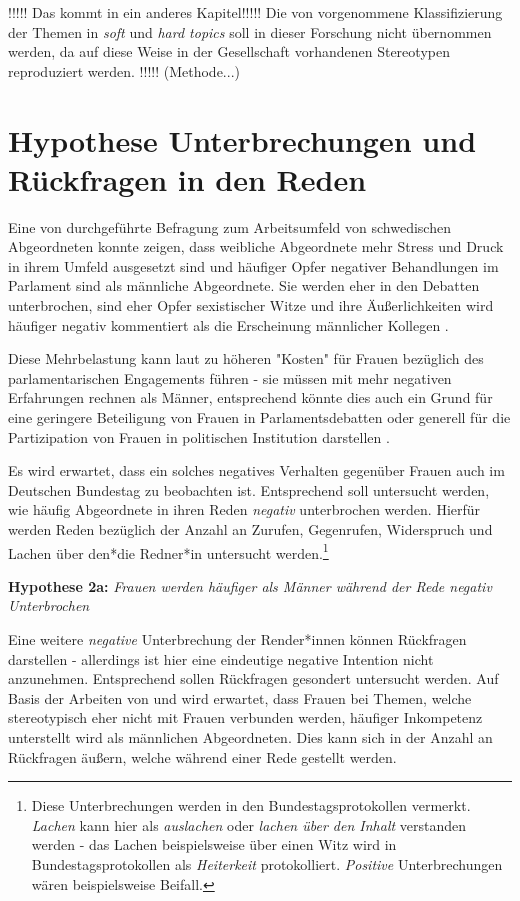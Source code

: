 \documentclass[12pt, 
    twoside=false, 
    bibliography=totoc, 
    numbers=endperiod, 
    headings=normal, 
    toc=chapterentrydotfill
    ]{scrbook}
\begin{document}
!!!!!  Das kommt in ein anderes Kapitel!!!!! Die von \textcite{back_2014} vorgenommene Klassifizierung der Themen in \emph{soft} und \emph{hard topics} soll in dieser Forschung nicht übernommen werden, da auf diese Weise in der Gesellschaft vorhandenen Stereotypen reproduziert werden. !!!!! (Methode...) 

\section{Hypothese Unterbrechungen und Rückfragen in den Reden}

Eine von \textcite{erikson_2018} durchgeführte Befragung zum Arbeitsumfeld von schwedischen Abgeordneten konnte zeigen, dass weibliche Abgeordnete mehr Stress und Druck in ihrem Umfeld ausgesetzt sind und häufiger Opfer negativer Behandlungen im Parlament sind als männliche Abgeordnete. Sie werden eher in den Debatten unterbrochen, sind eher Opfer sexistischer Witze und ihre Äußerlichkeiten wird häufiger negativ kommentiert als die Erscheinung männlicher Kollegen \parencite[13]{erikson_2018}.

Diese Mehrbelastung kann laut \textcite{erikson_2018} zu höheren "Kosten" für Frauen bezüglich des parlamentarischen Engagements führen - sie müssen mit mehr negativen Erfahrungen rechnen als Männer, entsprechend könnte dies auch ein Grund für eine geringere Beteiligung von Frauen in Parlamentsdebatten oder generell für die Partizipation von Frauen in politischen Institution darstellen \parencites[vgl.][]{erikson_2018}[vgl.][]{back_2014}.

Es wird erwartet, dass ein solches negatives Verhalten gegenüber Frauen auch im Deutschen Bundestag zu beobachten ist. Entsprechend soll untersucht werden, wie häufig Abgeordnete in ihren Reden \emph{negativ} unterbrochen werden. Hierfür werden Reden bezüglich der Anzahl an Zurufen, Gegenrufen, Widerspruch und Lachen über den*die Redner*in untersucht werden.\footnote{Diese Unterbrechungen werden in den Bundestagsprotokollen vermerkt. \emph{Lachen} kann hier als \emph{auslachen} oder \emph{lachen über den Inhalt} verstanden werden - das Lachen beispielsweise über einen Witz wird in Bundestagsprotokollen als \emph{Heiterkeit} protokolliert. \emph{Positive} Unterbrechungen wären beispielsweise Beifall.}

\textbf{Hypothese 2a:} \emph{Frauen werden häufiger als Männer während der Rede negativ Unterbrochen}

Eine weitere \emph{negative} Unterbrechung der Render*innen können Rückfragen darstellen - allerdings ist hier eine eindeutige negative Intention nicht anzunehmen. Entsprechend sollen Rückfragen gesondert untersucht werden. Auf Basis der Arbeiten von \textcite{brescoll_2011} und \textcite{eagly_2002} wird erwartet, dass Frauen bei Themen, welche stereotypisch eher nicht mit Frauen verbunden werden, häufiger Inkompetenz unterstellt wird als männlichen Abgeordneten. Dies kann sich in der Anzahl an Rückfragen äußern, welche während einer Rede gestellt werden. 
\end{document}
